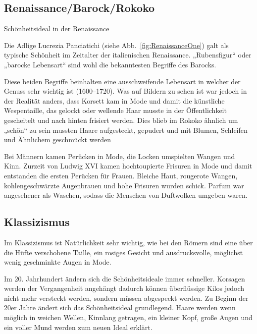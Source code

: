 \subsection{Renaissance/Barock/Rokoko}

\begin{figurewrapper}
	 \hfill
	\caption{Schönheitsideal in der Renaissance}
\end{figurewrapper}

Die Adlige Lucrezia Panciatichi (siehe Abb.~\vref{fig:RenaissanceOne}) galt als typische
Schönheit im Zeitalter der italienischen Renaissance. „Rubensfigur“ oder „barocke Lebensart“ sind
wohl die bekanntesten Begriffe des Barocks.


Diese beiden Begriffe beinhalten eine ausschweifende Lebensart in welcher der Genuss sehr wichtig ist
(1600--1720). Was auf Bildern zu sehen ist war jedoch in der Realität anders, dass Korsett kam in
Mode und damit die künstliche Wespentaille, das gelockt oder wellende Haar musste in der
Öffentlichkeit gescheitelt und nach hinten frisiert werden.
Dies blieb im Rokoko ähnlich um „schön“ zu sein mussten Haare aufgesteckt, gepudert und mit Blumen,
Schleifen und Ähnlichem geschmückt werden

Bei Männern kamen Perücken in Mode, die Locken umspielten Wangen und Kinn.
Zurzeit von Ludwig XVI kamen hochtoupierte Frisuren in Mode und damit entstanden die ersten Perücken
für Frauen. Bleiche Haut, rougerote Wangen, kohlengeschwärzte Augenbrauen und hohe Frisuren wurden
schick. Parfum war angesehener als Waschen, sodass die Menschen
von Duftwolken umgeben waren.

\subsection{Klassizismus}
Im Klassizismus ist Natürlichkeit sehr wichtig, wie bei den Römern sind eine über die Hüfte
verschobene Taille, ein rosiges Gesicht und ausdrucksvolle, möglichst wenig geschminkte Augen in
Mode.

Im 20. Jahrhundert ändern sich die Schönheitsideale immer schneller. Korsagen werden der
Vergangenheit angehängt dadurch können überflüssige Kilos jedoch nicht mehr versteckt werden,
sondern müssen abgespeckt werden. Zu Beginn der 20er Jahre ändert sich das Schönheitsideal
grundlegend. Haare werden wenn möglich in weichen Wellen, Kinnlang getragen, ein kleiner Kopf, große
Augen und ein voller Mund werden zum neuen Ideal erklärt.

